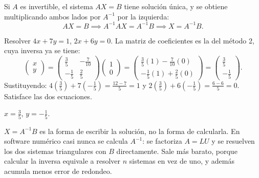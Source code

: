 \documentclass[11pt,letterpaper]{article}
\begin{document}
Si $A$ es invertible, el sistema $AX = B$ tiene solución única, y se
obtiene multiplicando ambos lados por $A^{-1}$ por la izquierda:
\[
    AX = B \implies A^{-1}AX = A^{-1}B \implies X = A^{-1}B .
\]

\begin{ejemplo}
    Resolver $4x + 7y = 1$, $2x + 6y = 0$. La matriz de coeficientes
    es la del método 2, cuya inversa ya se tiene:
    \[
        \begin{pmatrix} x \\ y \end{pmatrix}
        = \begin{pmatrix}
            \tfrac{3}{5} & -\tfrac{7}{10} \\[2pt]
            -\tfrac{1}{5} & \tfrac{2}{5}
        \end{pmatrix}
        \begin{pmatrix} 1 \\ 0 \end{pmatrix}
        = \begin{pmatrix}
            \tfrac{3}{5}(1) - \tfrac{7}{10}(0) \\[2pt]
            -\tfrac{1}{5}(1) + \tfrac{2}{5}(0)
        \end{pmatrix}
        = \begin{pmatrix} \tfrac{3}{5} \\[2pt] -\tfrac{1}{5}
        \end{pmatrix} .
    \]
    Sustituyendo: $4(\tfrac{3}{5}) + 7(-\tfrac{1}{5})
    = \tfrac{12 - 7}{5} = 1$ y $2(\tfrac{3}{5}) + 6(-\tfrac{1}{5})
    = \tfrac{6 - 6}{5} = 0$. Satisface las dos ecuaciones.
\end{ejemplo}

\begin{resultado}
    $x = \tfrac{3}{5}$, $y = -\tfrac{1}{5}$.
\end{resultado}

\begin{ojo}
    $X = A^{-1}B$ es la forma de escribir la solución, no la forma de
    calcularla. En software numérico casi nunca se calcula $A^{-1}$:
    se factoriza $A = LU$ y se resuelven los dos sistemas triangulares
    con $B$ directamente. Sale más barato, porque calcular la inversa
    equivale a resolver $n$ sistemas en vez de uno, y además acumula
    menos error de redondeo.
\end{ojo}

\end{document}
